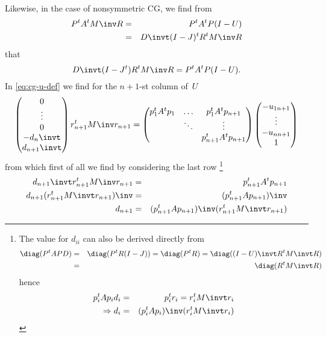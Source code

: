\documentclass[11pt]{artikel3}
\begin{document}
\begin{Outline}
Likewise, in the case of nonsymmetric CG, we find from
\begin{eqnarray*}
P^tA^tM\inv R&=&P^tA^tP(I-U)\\ &=&D\invt(I-J)^tR^tM\inv R
\end{eqnarray*}
that \begin{equation}
 D\invt(I-J^t)R^tM\inv R=P^tA^tP(I-U). \label{eq:cg-u-def}\end{equation}
In \eqref{eq:cg-u-def} we find for the $n+1$-st column of~$U$
\begin{equation}
        \begin{pmatrix}0\cr \vdots \cr 0 \cr -d_n\invt\cr d_{n+1}\invt\end{pmatrix}
                r_{n+1}^tM\inv r_{n+1}
        =\begin{pmatrix}p_1^tA^tp_1&\ldots&p_1^tA^tp_{n+1}\cr
                &\ddots&\vdots\cr
                &&p_{n+1}^tA^tp_{n+1}\end{pmatrix}
        \begin{pmatrix}-u_{1n+1}\cr \vdots \cr -u_{nn+1}\cr 1\end{pmatrix}
\end{equation}
from which first of all we find by considering the last row%
\footnote{The value for $d_{ii}$ can also be derived directly from
\begin{eqnarray*}
\diag(P^tAPD)&=&\diag(P^tR(I-J))=\diag(P^tR)=\diag((I-U)\invt R^tM\invt R)\\
&=&\diag(R^tM\invt R)\end{eqnarray*} hence
\begin{eqnarray*}
    p_i^tAp_i d_i&=&p_i^tr_i=r_i^tM\invt r_i\\
    \Rightarrow d_i&=&(p_i^tAp_i)\inv (r_i^tM\invt r_i)
    \end{eqnarray*}
}
\begin{eqnarray}
    d_{n+1}\invt r_{n+1}^tM\inv r_{n+1}&=&p_{n+1}^tA^tp_{n+1}
                \label{d:symm1}\\
    d_{n+1}(r_{n+1}^tM\invt r_{n+1})\inv&=&(p_{n+1}^tAp_{n+1})\inv
                \nonumber\\
    d_{n+1}&=&(p_{n+1}^tAp_{n+1})\inv (r_{n+1}^tM\invt r_{n+1})
                \label{d:symm}\end{eqnarray}
\begin{comment}
Observe the close resemblance of this formula to \eqref{eq:d-lanczos};
however, the occurrences of~$A$ are transposed between the one and
the other. This is due to the fact that BiCG has a generating
equation~$A^tQ=\nobreak\ldots$, while CG has~$AP=\nobreak\ldots$
in its place.
\end{comment}


\end{Outline}
\end{document}
